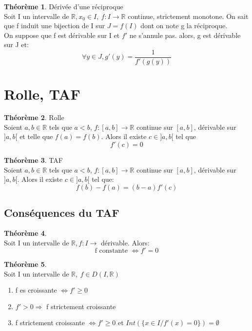 \documentclass[fleqn]{article}
\theoremstyle{definition} \newtheorem*{defi}{D\'efinition}
\theoremstyle{definition} \newtheorem*{theo}{Th\'eor\`eme}
\theoremstyle{remark} \newtheorem*{rqs}{Remarques}
\theoremstyle{definition} \newtheorem*{prop}{Propri\'et\'e}
\begin{document}
\begin{theo} D\'eriv\'ee d'une r\'eciproque\\
	Soit I un intervalle de $\mathbb{R}, x_0 \in I,\ f:I\rightarrow \mathbb{R}$ continue, strictement monotone. On sait que f induit une
	bijection de I sur $J=f(I)$ dont on note g la r\'eciproque. \\
	On suppose que f est d\'erivable sur I et $f'$ ne s'annule pas. alors, g est d\'erivable sur J et:
	\[\forall y \in J, g'(y) = \frac{1}{f'(g(y))}\]
\end{theo}

\section{Rolle, TAF}
\begin{theo} Rolle\\
	Soient $a, b \in \mathbb{R}$ tels que $a < b$, $f:[a,b] \rightarrow \mathbb{R}$ continue sur $[a,b]$, d\'erivable sur $]a,b[$ et telle que $f(a) = f(b)$. Alors il existe $c \in ]a,b[$
	tel que \[f'(c) = 0\]
\end{theo}

\begin{theo} TAF\\
	Soient $a, b \in \mathbb{R}$ tels que $a < b$,  $f:[a,b] \rightarrow \mathbb{R}$ continue sur $[a,b]$, d\'erivable sur $]a,b[$.
	Alors il existe $c \in ]a,b[$ tel que:
	\[f(b) - f(a) = (b-a)f'(c)\]
\end{theo}

\subsection{Cons\'equences du TAF}
\begin{theo} $ $\\
	Soit I un intervalle de $\mathbb{R}, f:I \rightarrow$ d\'erivable. Alors:
	\[\text{f constante }\Leftrightarrow f' = 0\]
\end{theo}

\begin{theo} $ $ \\
	Soit I un intervalle de $\mathbb{R},\ f \in D(I, \mathbb{R})$
	\begin{enumerate}
		\item f es croissante $\Leftrightarrow f' \geq 0$
		\item $f' > 0 \Rightarrow $ f strictement croissante
		\item f strictement croissante $\Leftrightarrow f' \geq 0$ et $Int(\{x\in I /f'(x) = 0\}) = \emptyset$
	\end{enumerate}
\end{theo}
\end{document}

